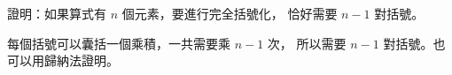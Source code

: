 \startEXERCISE
證明：如果算式有 $n$ 個元素，要進行完全括號化，
恰好需要 $n-1$ 對括號。
\stopEXERCISE

\startANSWER
每個括號可以囊括一個乘積，一共需要乘 $n-1$ 次，
所以需要 $n-1$ 對括號。也可以用歸納法證明。
\stopANSWER
